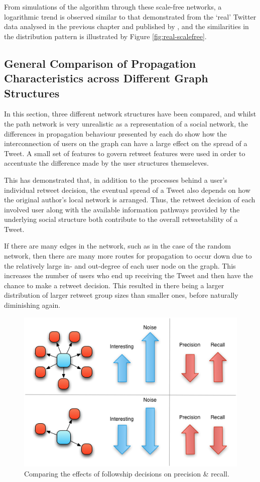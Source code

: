 From simulations of the algorithm through these scale-free networks, a logarithmic trend is observed similar to that demonstrated from the `real' Twitter data analysed in the previous chapter and published by \citet{webberley11}, and the similarities in the distribution pattern is illustrated by Figure \ref{fig:real-scalefree}.


\subsection{General Comparison of Propagation Characteristics across Different Graph Structures}
In this section, three different network structures have been compared, and whilst the path network is very unrealistic as a representation of a social network, the differences in propagation behaviour presented by each do show how the interconnection of users on the graph can have a large effect on the spread of a Tweet. A small set of features to govern retweet features were used in order to accentuate the difference made by the user structures themseleves.

This has demonstrated that, in addition to the processes behind a user's individual retweet decision, the eventual spread of a Tweet also depends on how the original author's local network is arranged. Thus, the retweet decision of each involved user along with the available information pathways provided by the underlying social structure both contribute to the overall retweetability of a Tweet. 

If there are many edges in the network, such as in the case of the random network, then there are many more routes for propagation to occur down due to the relatively large in- and out-degree of each user node on the graph. This increases the number of users who end up receiving the Tweet and then have the chance to make a retweet decision. This resulted in there being a larger distribution of larger retweet group sizes than smaller ones, before naturally diminishing again. 

\begin{figure}[h]
\centering
\includegraphics[scale=0.8]{4.Chapter2/Media/precision_recall.png} 
\caption{Comparing the effects of followship decisions on precision \& recall.}
\label{fig:precision_recall}
\end{figure}

